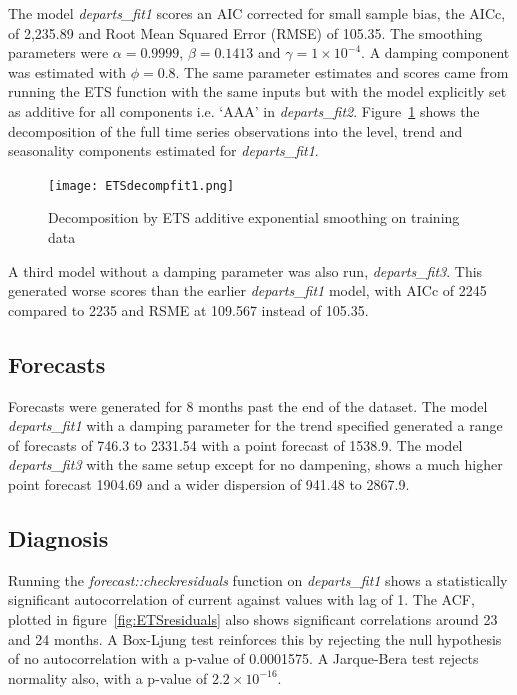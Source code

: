 \documentclass[9pt,technote]{IEEEtran}
\begin{document}
The model \textit{departs\_fit1} scores an AIC corrected for small sample bias, the AICc, of 2,235.89 and Root Mean Squared Error (RMSE) of 105.35.  The smoothing parameters were $\alpha = 0.9999$, $\beta = 0.1413$ and $\gamma = 1 \times 10^{-4}$.  A damping component was estimated with $\phi = 0.8$.  The same parameter estimates and scores came from running the ETS function with the same inputs but with the model explicitly set as additive for all components i.e. `AAA' in \textit{departs\_fit2}.  Figure~\ref{fig:ETSdecomp} shows the decomposition of the full time series observations into the level, trend and seasonality components estimated for \textit{departs\_fit1}.  

\begin{figure}[htbp]
\centerline{\texttt{[image: ETSdecompfit1.png]}}
\caption{Decomposition by ETS additive exponential smoothing on training data}
\label{fig:ETSdecomp}
\end{figure}

A third model without a damping parameter was also run, \textit{departs\_fit3}.  This generated worse scores than the earlier \textit{departs\_fit1} model, with AICc of 2245 compared to 2235 and RSME at 109.567 instead of 105.35.  

\subsection{Forecasts}

Forecasts were generated for 8 months past the end of the dataset.  The model \textit{departs\_fit1} with a damping parameter for the trend specified generated a range of forecasts of 746.3 to 2331.54 with a point forecast of 1538.9.  The model \textit{departs\_fit3} with the same setup except for no dampening, shows a much higher point forecast 1904.69 and a wider dispersion of 941.48 to 2867.9.  

\subsection{Diagnosis}

Running the \textit{forecast::checkresiduals} function on \textit{departs\_fit1} shows a statistically significant autocorrelation of current against values with lag of 1.  The ACF, plotted in figure~\ref{fig:ETSresiduals} also shows significant correlations around 23 and 24 months. A Box-Ljung test reinforces this by rejecting the null hypothesis of no autocorrelation with a p-value of 0.0001575.  A Jarque-Bera test rejects normality also, with a p-value of $2.2 \times 10^{-16}$. 
\end{document}
